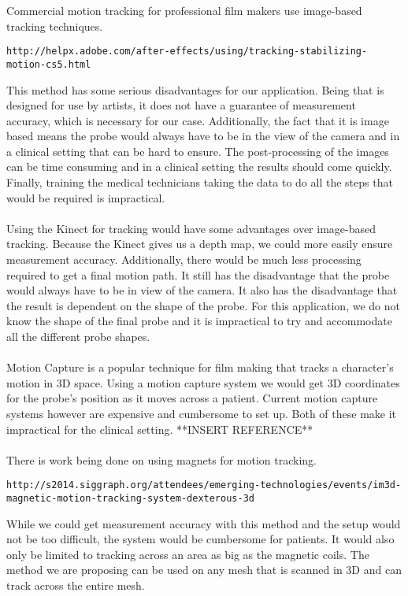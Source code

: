 \documentclass[11pt,psfig]{article}
\begin{document}
Commercial motion tracking for professional film makers use image-based tracking techniques. 
\begin{verbatim}
http://helpx.adobe.com/after-effects/using/tracking-stabilizing-motion-cs5.html
\end{verbatim}
This method has some serious disadvantages for our application. Being that is designed for use by artists, it does not have a guarantee of measurement accuracy, which is necessary for our case. Additionally, the fact that it is image based means the probe would always have to be in the view of the camera and in a clinical setting that can be hard to ensure. The post-processing of the images can be time consuming and in a clinical setting the results should come quickly. Finally, training the medical technicians taking the data to do all the steps that would be required is impractical. \\
\\
Using the Kinect for tracking would have some advantages over image-based tracking. Because the Kinect gives us a depth map, we could more easily ensure measurement accuracy. Additionally, there would be much less processing required to get a final motion path. It still has the disadvantage that the probe would always have to be in view of the camera. It also has the disadvantage that the result is dependent on the shape of the probe. For this application, we do not know the shape of the final probe and it is impractical to try and accommodate all the different probe shapes.\\
\\
Motion Capture is a popular technique for film making that tracks a character's motion in 3D space. Using a motion capture system we would get 3D coordinates for the probe's position as it moves across a patient. Current motion capture systems however are expensive and cumbersome to set up. Both of these make it impractical for the clinical setting. **INSERT REFERENCE**\\
\\
There is work being done on using magnets for motion tracking.
\begin{verbatim}
http://s2014.siggraph.org/attendees/emerging-technologies/events/im3d-magnetic-motion-tracking-system-dexterous-3d
\end{verbatim}
While we could get measurement accuracy with this method and the setup would not be too difficult, the system would be cumbersome for patients. It would also only be limited to tracking across an area as big as the magnetic coils. The method we are proposing can be used on any mesh that is scanned in 3D and can track across the entire mesh.\\
\end{document}
